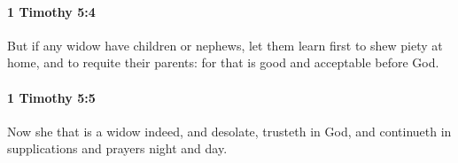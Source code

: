 		\paragraph{1 Timothy 5:4} %
			\label{1TIMOTHY-5-4}

			But if any widow have children or nephews, let them learn first to shew piety at home, and to requite their parents: for that is good and acceptable before God.

			\begin{framed}
			\scriptsize
				\begin{compactdesc}
					\item[SBLG] 
				\end{compactdesc}
			\end{framed}

		\paragraph{1 Timothy 5:5} %
			\label{1TIMOTHY-5-5}

			Now she that is a widow indeed, and desolate, trusteth in God, and continueth in supplications and prayers night and day.

